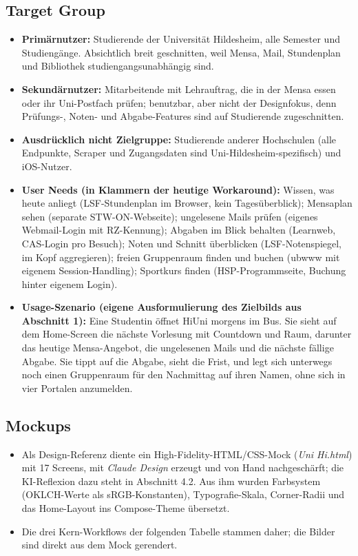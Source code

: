\documentclass{msereport}
\begin{document}
\subsection{Target Group}

\begin{itemize}
  \item \textbf{Primärnutzer:} Studierende der Universität Hildesheim, alle
        Semester und Studiengänge. Absichtlich breit geschnitten, weil Mensa,
        Mail, Stundenplan und Bibliothek studiengangsunabhängig sind.
  \item \textbf{Sekundärnutzer:} Mitarbeitende mit Lehrauftrag, die in der Mensa
        essen oder ihr Uni-Postfach prüfen; benutzbar, aber nicht der
        Designfokus, denn Prüfungs-, Noten- und Abgabe-Features sind auf
        Studierende zugeschnitten.
  \item \textbf{Ausdrücklich nicht Zielgruppe:} Studierende anderer Hochschulen
        (alle Endpunkte, Scraper und Zugangsdaten sind Uni-Hildesheim-spezifisch)
        und iOS-Nutzer.
  \item \textbf{User Needs (in Klammern der heutige Workaround):} Wissen, was
        heute anliegt (LSF-Stundenplan im Browser, kein Tagesüberblick);
        Mensaplan sehen (separate STW-ON-Webseite); ungelesene Mails prüfen
        (eigenes Webmail-Login mit RZ-Kennung); Abgaben im Blick behalten
        (Learnweb, CAS-Login pro Besuch); Noten und Schnitt überblicken
        (LSF-Notenspiegel, im Kopf aggregieren); freien Gruppenraum finden und
        buchen (ubwww mit eigenem Session-Handling); Sportkurs finden
        (HSP-Programmseite, Buchung hinter eigenem Login).
  \item \textbf{Usage-Szenario (eigene Ausformulierung des Zielbilds aus
        Abschnitt 1):} Eine Studentin öffnet HiUni morgens im Bus. Sie sieht auf
        dem Home-Screen die nächste Vorlesung mit Countdown und Raum, darunter
        das heutige Mensa-Angebot, die ungelesenen Mails und die nächste fällige
        Abgabe. Sie tippt auf die Abgabe, sieht die Frist, und legt sich
        unterwegs noch einen Gruppenraum für den Nachmittag auf ihren Namen,
        ohne sich in vier Portalen anzumelden.
\end{itemize}

\subsection{Mockups}

\begin{itemize}
  \item Als Design-Referenz diente ein High-Fidelity-HTML/CSS-Mock
        (\emph{Uni Hi.html}) mit 17 Screens, mit \emph{Claude Design} erzeugt und
        von Hand nachgeschärft; die KI-Reflexion dazu steht in Abschnitt 4.2. Aus
        ihm wurden Farbsystem (OKLCH-Werte als sRGB-Konstanten),
        Typografie-Skala, Corner-Radii und das Home-Layout ins Compose-Theme
        übersetzt.
  \item Die drei Kern-Workflows der folgenden Tabelle stammen daher; die Bilder
        sind direkt aus dem Mock gerendert.
\end{itemize}
\end{document}
